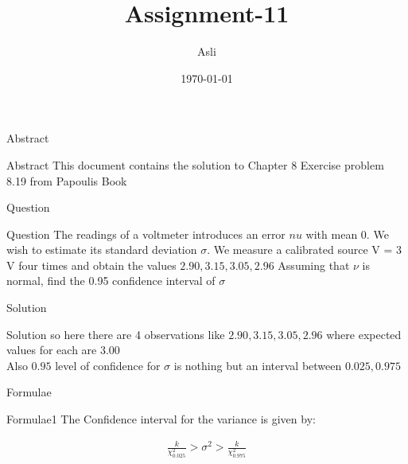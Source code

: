 \documentclass{beamer}
\title{ Assignment-11}
\author{Asli}
\institute{IIT Hyderabad}
\date{\today }
\begin{document}
\begin{frame}
      \titlepage
\end{frame}



\begin{frame}{Abstract}
     \begin{block}{Abstract}
          This document contains the solution to Chapter 8 Exercise problem 8.19 from Papoulis Book
      \end{block}
\end{frame}



\begin{frame}{Question}
      \begin{block}{Question}
           The readings of a voltmeter introduces an error $nu$ with mean $0$. We wish to estimate its standard deviation $\sigma$. We measure a calibrated source V = 3 V four times and obtain the values $ 2.90, 3.15 , 3.05, 2.96 $ Assuming that $\nu$ is normal, find the 0.95 confidence interval of $\sigma$
      \end{block}
\end{frame}



\begin{frame}{Solution}
       \begin{block}{Solution}
        so here there are 4 observations like  $ 2.90, 3.15 , 3.05, 2.96 $ where expected values for each are $ 3.00 $ \\
        Also $ 0.95 $ level of confidence for $\sigma$ is nothing but an interval between $ 0.025 , 0.975 $ 
       \end{block}
\end{frame}



\begin{frame}{Formulae}
    \begin{block}{Formulae1}
            The Confidence interval for the variance is given by:
            
               \begin{align}
                   \frac{k}{\chi^{2}_{0.025}} > \sigma^{2} > \frac{k}{\chi^{2}_{0.975}}
                   \label{form_1}
               \end{align}
               
    \end{block}
\end{frame}
\end{document}

